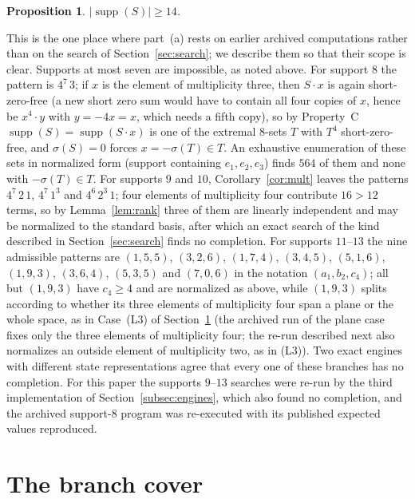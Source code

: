 \documentclass[11pt]{article}
\newtheorem{proposition}[theorem]{Proposition}
\theoremstyle{definition}
\theoremstyle{remark}
\newcommand{\supp}{\operatorname{supp}}
\begin{document}
\begin{proposition}\label{prop:small-support}
$|\supp(S)|\ge14$.
\end{proposition}

This is the one place where part~(a) rests on earlier archived computations rather than on the search of Section~\ref{sec:search}; we describe them so that their scope is clear. Supports at most seven are impossible, as noted above. For support $8$ the pattern is $4^7\,3$; if $x$ is the element of multiplicity three, then $S\cdot x$ is again short-zero-free (a new short zero sum would have to contain all four copies of $x$, hence be $x^4\cdot y$ with $y=-4x=x$, which needs a fifth copy), so by Property~C $\supp(S)=\supp(S\cdot x)$ is one of the extremal $8$-sets $T$ with $T^4$ short-zero-free, and $\sigma(S)=0$ forces $x=-\sigma(T)\in T$. An exhaustive enumeration of these sets in normalized form (support containing $e_1,e_2,e_3$) finds $564$ of them and none with $-\sigma(T)\in T$. For supports $9$ and $10$, Corollary~\ref{cor:mult} leaves the patterns $4^7\,2\,1$, $4^7\,1^3$ and $4^6\,2^3\,1$; four elements of multiplicity four contribute $16>12$ terms, so by Lemma~\ref{lem:rank} three of them are linearly independent and may be normalized to the standard basis, after which an exact search of the kind described in Section~\ref{sec:search} finds no completion. For supports $11$--$13$ the nine admissible patterns are $(1,5,5)$, $(3,2,6)$, $(1,7,4)$, $(3,4,5)$, $(5,1,6)$, $(1,9,3)$, $(3,6,4)$, $(5,3,5)$ and $(7,0,6)$ in the notation $(a_1,b_2,c_4)$; all but $(1,9,3)$ have $c_4\ge4$ and are normalized as above, while $(1,9,3)$ splits according to whether its three elements of multiplicity four span a plane or the whole space, as in Case~(L3) of Section~\ref{sec:cover} (the archived run of the plane case fixes only the three elements of multiplicity four; the re-run described next also normalizes an outside element of multiplicity two, as in (L3)). Two exact engines with different state representations agree that every one of these branches has no completion. For this paper the supports $9$--$13$ searches were re-run by the third implementation of Section~\ref{subsec:engines}, which also found no completion, and the archived support-$8$ program was re-executed with its published expected values reproduced.

\section{The branch cover}\label{sec:cover}
\end{document}

